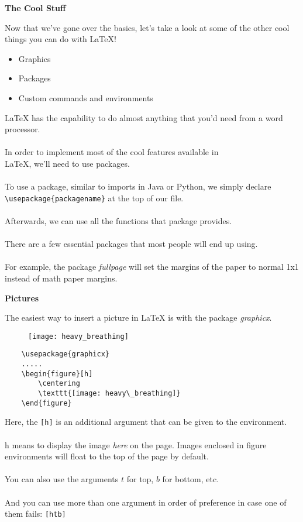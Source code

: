 \documentclass[a4paper,12pt]{article}
\begin{document}

\newpage
\begin{center}
	\bf{\Huge{The Cool Stuff}}
\end{center}
\bigskip
\LARGE
Now that we've gone over the basics, let's take a look at some of the other cool things you can do with LaTeX!
\begin{itemize}
	\item Graphics
	\item Packages
	\item Custom commands and environments
\end{itemize}
\bigskip
\Large
LaTeX has the capability to do almost anything that you'd need from a word processor. \\\\
In order to implement most of the cool features available in \\ LaTeX, we'll need to use packages. \\\\
To use a package, similar to imports in Java or Python, we simply declare \verb|\usepackage{packagename}| at the top of our file. \\\\
Afterwards, we can use all the functions that package provides. \\\\
There are a few essential packages that most people will end up using. \\\\
For example, the package \textit{fullpage} will set the margins of the paper to normal 1x1 instead of math paper margins.

\newpage
\begin{center}
  	\bf{\Huge{Pictures}}
\end{center}
\bigskip
\Large
The easiest way to insert a picture in LaTeX is with the package \textit{graphicx}. \\
\begin{figure}[h]
	\centering
		\texttt{[image: heavy\_breathing]}
\end{figure}
\large
\begin{verbatim}
	\usepackage{graphicx}
	.....
	\begin{figure}[h]
		\centering
		\texttt{[image: heavy\_breathing]}
	\end{figure}
\end{verbatim}
\bigskip
Here, the \verb|[h]| is an additional argument that can be given to the environment. \\\\
h means to display the image \textit{here} on the page. Images enclosed in figure environments will float to the top of the page by default. \\\\
You can also use the arguments $t$ for top, $b$ for bottom, etc. \\\\
And you can use more than one argument in order of preference in case one of them fails: \verb|[htb]|
\end{document}
